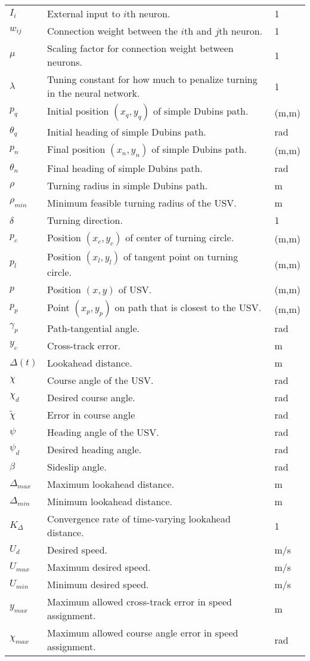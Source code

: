 \begin{center}
\begin{longtable}{ p{} p{} p{} }
	$I_i$ & External input to $i$th neuron. & 1 \\
	$w_{ij}$ & Connection weight between the $i$th and $j$th neuron. & 1 \\
	$\mu$ & Scaling factor for connection weight between neurons. & 1 \\
	$\lambda$ & Tuning constant for how much to penalize turning in the neural network. & 1 \\
	$p_q$ & Initial position $(x_q,y_q)$ of simple Dubins path. & (m,m) \\
	$\theta_q$ & Initial heading of simple Dubins path. & rad \\
	$p_n$ & Final position $(x_n,y_n)$ of simple Dubins path. & (m,m) \\
	$\theta_n$ & Final heading of simple Dubins path. & rad \\
	$\rho$ & Turning radius in simple Dubins path. & m \\
	$\rho_{min}$ & Minimum feasible turning radius of the USV. & m \\
	$\delta$ & Turning direction. & 1 \\
	$p_c$ & Position $(x_c,y_c)$ of center of turning circle. & (m,m) \\
	$p_l$ & Position $(x_l,y_l)$ of tangent point on turning circle. & (m,m) \\
	$p$ & Position $(x,y)$ of USV. & (m,m) \\
	$p_p$ & Point $(x_p, y_p)$ on path that is closest to the USV. & (m,m) \\
	$\gamma_p$ & Path-tangential angle. & rad \\
	$y_e$ & Cross-track error. & m \\
	$\Delta(t)$ & Lookahead distance. & m \\
	$\chi$ & Course angle of the USV. & rad \\
	$\chi_d$ & Desired course angle. & rad \\
	$\tilde{\chi}$ & Error in course angle & rad \\
	$\psi$ & Heading angle of the USV. & rad \\
	$\psi_d$ & Desired heading angle. & rad \\
	$\beta$ & Sideslip angle. & rad \\
	$\Delta_{max}$ & Maximum lookahead distance. & m \\
   	$\Delta_{min}$ & Minimum lookahead distance. & m \\
   	$K_\Delta$ & Convergence rate of time-varying lookahead distance. & 1\\ 
   	$U_d$ & Desired speed. & m/s \\
   	$U_{max}$ & Maximum desired speed. & m/s\\
   	$U_{min}$ & Minimum desired speed. & m/s \\
   	$y_{max}$ & Maximum allowed cross-track error in speed assignment. & m \\
   	$\chi_{max}$ & Maximum allowed course angle error in speed assignment. & rad \\
\end{longtable}
\end{center}

\thispagestyle{plain}


\clearpage

\pagestyle{headings}
